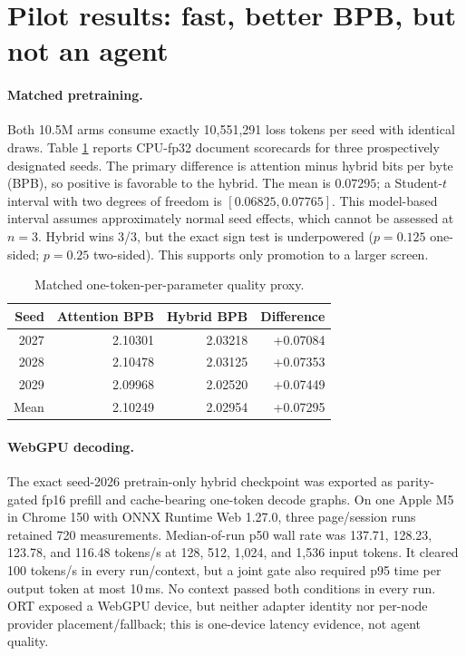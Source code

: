 \documentclass{article}
\begin{document}
\section{Pilot results: fast, better BPB, but not an agent}

\paragraph{Matched pretraining.}
Both 10.5M arms consume exactly 10,551,291 loss tokens per seed with identical draws.  Table
\ref{tab:quality} reports CPU-fp32 document scorecards for three prospectively designated seeds.
The primary difference is attention minus hybrid bits per byte (BPB), so positive is favorable to
the hybrid.  The mean is \(0.07295\); a Student-\(t\) interval with two degrees of freedom is
\([0.06825,0.07765]\).  This model-based interval assumes approximately normal seed effects, which
cannot be assessed at \(n=3\).  Hybrid wins 3/3, but the exact sign test is underpowered
(\(p=0.125\) one-sided; \(p=0.25\) two-sided).  This supports only promotion to a larger screen.

\begin{table}[t]
  \caption{Matched one-token-per-parameter quality proxy.}
  \label{tab:quality}
  \centering
  \small
  \begin{tabular}{@{}rrrr@{}}
    \toprule
    Seed & Attention BPB & Hybrid BPB & Difference \\
    \midrule
    2027 & 2.10301 & 2.03218 & +0.07084 \\
    2028 & 2.10478 & 2.03125 & +0.07353 \\
    2029 & 2.09968 & 2.02520 & +0.07449 \\
    \midrule
    Mean & 2.10249 & 2.02954 & +0.07295 \\
    \bottomrule
  \end{tabular}
\end{table}

\paragraph{WebGPU decoding.}
The exact seed-2026 pretrain-only hybrid checkpoint was exported as parity-gated fp16 prefill and
cache-bearing one-token decode graphs.  On one Apple M5 in Chrome 150 with ONNX Runtime Web
1.27.0, three page/session runs retained 720 measurements.  Median-of-run p50 wall rate was
137.71, 128.23, 123.78, and 116.48 tokens/s at 128, 512, 1,024, and 1,536 input tokens.  It cleared
100 tokens/s in every run/context, but a joint gate also required p95 time per output token at
most 10\,ms.  No context passed both conditions in every run.  ORT exposed a WebGPU device, but
neither adapter identity nor per-node provider placement/fallback; this is one-device latency
evidence, not agent quality.
\end{document}
